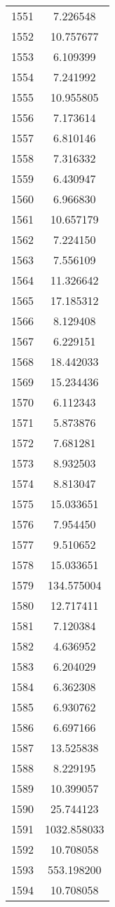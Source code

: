 \documentclass[12pt]{article}
\begin{document}
\begin{longtable}{@{}cc@{}}
1551 & 7.226548 \\
1552 & 10.757677 \\
1553 & 6.109399 \\
1554 & 7.241992 \\
1555 & 10.955805 \\
1556 & 7.173614 \\
1557 & 6.810146 \\
1558 & 7.316332 \\
1559 & 6.430947 \\
1560 & 6.966830 \\
1561 & 10.657179 \\
1562 & 7.224150 \\
1563 & 7.556109 \\
1564 & 11.326642 \\
1565 & 17.185312 \\
1566 & 8.129408 \\
1567 & 6.229151 \\
1568 & 18.442033 \\
1569 & 15.234436 \\
1570 & 6.112343 \\
1571 & 5.873876 \\
1572 & 7.681281 \\
1573 & 8.932503 \\
1574 & 8.813047 \\
1575 & 15.033651 \\
1576 & 7.954450 \\
1577 & 9.510652 \\
1578 & 15.033651 \\
1579 & 134.575004 \\
1580 & 12.717411 \\
1581 & 7.120384 \\
1582 & 4.636952 \\
1583 & 6.204029 \\
1584 & 6.362308 \\
1585 & 6.930762 \\
1586 & 6.697166 \\
1587 & 13.525838 \\
1588 & 8.229195 \\
1589 & 10.399057 \\
1590 & 25.744123 \\
1591 & 1032.858033 \\
1592 & 10.708058 \\
1593 & 553.198200 \\
1594 & 10.708058 \\

\end{longtable}
\end{document}

